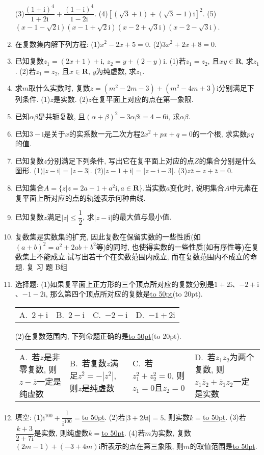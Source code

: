 \documentclass[10pt,a4paper]{article}
\newcommand{\blank}[1]{\underline{\hbox to #1pt{}}}
\newcommand{\bracket}[1]{(\hbox to #1pt{})}
\newcommand{\fourch}[4]{\par\begin{tabular}{p{.23\textwidth}p{.23\textwidth}p{.23\textwidth}p{.23\textwidth}}
A.~#1 &B.~#2& C.~#3& D.~#4
\end{tabular}}
\begin{document}
\begin{enumerate}[1.]
(3)$\dfrac{{{(1+\mathrm{i})}^4}}{1+2\mathrm{i}}+\dfrac{{{(1-\mathrm{i})}^4}}{1-2\mathrm{i}}$.					(4)$[(\sqrt 3+1)+(\sqrt 3-1)\mathrm{i}]^2$.
(5)$(x-1-\sqrt 2\mathrm{i})(x-1+\sqrt 2\mathrm{i})(x-2+\sqrt 3\mathrm{i})(x-2-\sqrt 3\mathrm{i})$.
\item 在复数集内解下列方程:
(1)$x^2-2x+5=0$.						(2)$3x^2+2x+8=0$.
\item 已知复数$z_1=(2x+1)+\mathrm{i}$, $z_2=y+(2-y)\mathrm{i}$.
(1)若$z_1=z_2$, 且$xy\in \mathbf{R}$, 求$z_1$.
(2)若$z_1=z_2$, 且$x\in \mathbf{R}$, $y$为纯虚数, 求$z_1$.
\item 求$m$取什么实数时, 复数$z=(m^2-2m-3)+(m^2-4m+3)\mathrm{i}$分别满足下列条件.
(1)$z$是实数.
(2)$z$在复平面上对应的点在第一象限.
\item 已知$\alpha \beta$是共轭复数, 且$(\alpha +\beta)^2-3\alpha \beta \mathrm{i}=4-6\mathrm{i}$, 求$\alpha \beta$.
\item 已知$3-\mathrm{i}$是关于$x$的实系数一元二次方程$2x^2+px+q=0$的一个根, 求实数$pq$的值.
\item 已知复数$z$分别满足下列条件, 写出它在复平面上对应的点$Z$的集合分别是什么图形.
(1)$|z-\mathrm{i}|=|z-3|$.						(2)$|z-1+\mathrm{i}|=|z-\mathrm{i}-3|$.
(3)$z\overline z+z+\overline z=0$.
\item 已知集合$A=\{z|z=2a-1+a^2\mathrm{i},a\in \mathbf{R}\}$.当实数$a$变化时, 说明集合$A$中元素在复平面上所对应的点的轨迹表示何种曲线.
\item 已知复数$z$满足$|z|\le \dfrac 12$, 求$|z-\mathrm{i}|$的最大值与最小值.
\item 复数集是实数集的扩充, 因此复数在保留实数的一些性质(如$(a+b)^2=a^2+2ab+b^2$等)的同时, 也使得实数的一些性质(如有序性等)在复数集上不能成立.试写出若干个在实数范围内成立, 而在复数范围内不成立的命题.
复 习 题
B组
\item 选择题:
(1)如果复平面上正方形的三个顶点所对应的复数分别是$1+2\mathrm{i}$、$-2+\mathrm{i}$、$-1-2\mathrm{i}$, 那么第四个顶点所对应的复数是\blank{50}\bracket{20}.
\fourch{$2+\mathrm{i}$}{$2-\mathrm{i}$}{$-2-\mathrm{i}$}{$-1+2\mathrm{i}$}
(2)在复数范围内, 下列命题正确的是\blank{50}\bracket{20}.
\fourch{若$z$是非零复数, 则$z-\overline z$一定是纯虚数}{若复数$z$满足$z^2=-|z^2|$, 则$z$是纯虚数}{若$z_1^2+z_2^2=0$, 则$z_1=0$且$z_2=0$}{若$z_1z_2$为两个复数, 则$z_1\overline  z_2+\overline  z_1z_2$一定是实数}
\item 填空:
(1)$\mathrm{i}^{100}+\dfrac 1{\mathrm{i}^{100}}=$\blank{50}.
(2)若$|3+2k\mathrm{i}|=5$, 则实数$k=$\blank{50}.
(3)若$\dfrac{k+3}{2+7\mathrm{i}}$是实数, 则纯虚数$k=$\blank{50}.
(4)若$m$为实数, 复数$(2m-1)+(-3+4m)\mathrm{i}$所表示的点在第三象限, 则$m$的取值范围是\blank{50}.

\end{enumerate}
\end{document}
